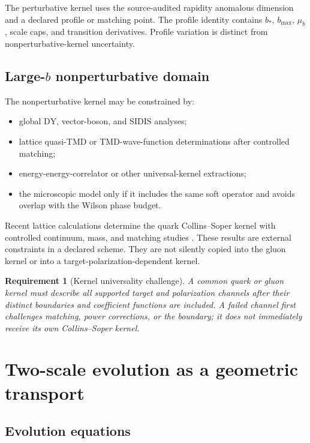 \documentclass[11pt]{article}
\newtheorem{requirement}[definition]{Requirement}
\newcommand{\DY}{\mathrm{DY}}
\newcommand{\SIDIS}{\mathrm{SIDIS}}
\begin{document}
The perturbative kernel uses the source-audited rapidity anomalous dimension and a declared profile or matching point.  The profile identity contains \(b_\ast\), \(b_{\max}\), \(\mu_b\), scale caps, and transition derivatives.  Profile variation is distinct from nonperturbative-kernel uncertainty.

\subsection{Large-\texorpdfstring{\(b\)}{b} nonperturbative domain}

The nonperturbative kernel may be constrained by:
\begin{itemize}
\item global \(\DY\), vector-boson, and \(\SIDIS\) analyses;
\item lattice quasi-TMD or TMD-wave-function determinations after controlled matching;
\item energy-energy-correlator or other universal-kernel extractions;
\item the microscopic model only if it includes the same soft operator and avoids overlap with the Wilson phase budget.
\end{itemize}

Recent lattice calculations determine the quark Collins--Soper kernel with controlled continuum, mass, and matching studies \cite{Avkhadiev2024,TanEtAl2025}.  These results are external constraints in a declared scheme.  They are not silently copied into the gluon kernel or into a target-polarization-dependent kernel.

\begin{requirement}[Kernel universality challenge]
A common quark or gluon kernel must describe all supported target and polarization channels after their distinct boundaries and coefficient functions are included.  A failed channel first challenges matching, power corrections, or the boundary; it does not immediately receive its own Collins--Soper kernel.
\end{requirement}

\section{Two-scale evolution as a geometric transport}
\label{sec:evolution}

\subsection{Evolution equations}
\end{document}
